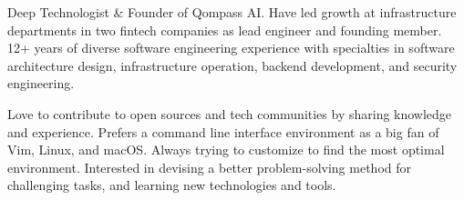 


\begin{cvparagraph}

Deep Technologist \& Founder of Qompass AI. Have led growth at infrastructure departments in two fintech companies as lead engineer and founding member. 12+ years of diverse software engineering experience with specialties in software architecture design, infrastructure operation, backend development, and security engineering.

Love to contribute to open sources and tech communities by sharing knowledge and experience. Prefers a command line interface environment as a big fan of Vim, Linux, and macOS. Always trying to customize to find the most optimal environment. Interested in devising a better problem-solving method for challenging tasks, and learning new technologies and tools.
\end{cvparagraph}
